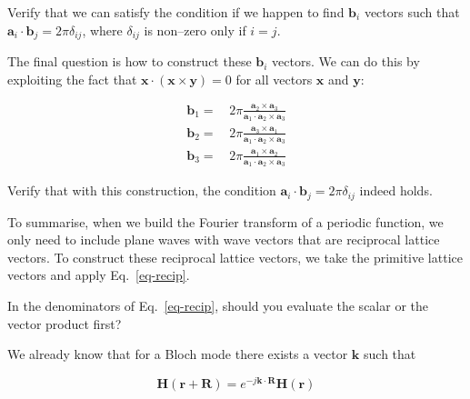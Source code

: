 \begin{cue}
Verify that we can satisfy the condition if we happen to find ${\mathbf b}_i$ vectors such that ${\mathbf a}_i \cdot {\mathbf b}_j = 2 \pi \delta_{ij}$, where $\delta_{ij}$ is non--zero only if $i=j$.
\end{cue}

The final question is how to construct these ${\mathbf b}_i$ vectors. We can do this by exploiting the fact that $ {\mathbf x} \cdot ({\mathbf x} \times {\mathbf y}) = 0$ for all vectors ${\mathbf x}$ and ${\mathbf y}$:

\begin{align}
{\mathbf b}_1 =&  \, 2 \pi \frac{{\mathbf a}_2 \times {\mathbf a}_3}{{\mathbf a}_1 \cdot {\mathbf a}_2 \times {\mathbf a}_3} \nonumber \\
  {\mathbf b}_2 =& \, 2 \pi \frac{{\mathbf a}_3 \times {\mathbf a}_1}{{\mathbf a}_1 \cdot {\mathbf a}_2 \times {\mathbf a}_3} \nonumber \\
  {\mathbf b}_3 =& \, 2 \pi \frac{{\mathbf a}_1 \times {\mathbf a}_2}{{\mathbf a}_1 \cdot {\mathbf a}_2 \times {\mathbf a}_3}
\label{eq-recip}
\end{align} 

\begin{cue}
Verify that with this construction, the condition  ${\mathbf a}_i \cdot {\mathbf b}_j = 2 \pi \delta_{ij}$ indeed holds. 
\end{cue}

To summarise, when we build the Fourier transform of a periodic function, we only need to include plane waves with wave vectors that are reciprocal lattice vectors. To construct these reciprocal lattice vectors, we take the primitive lattice vectors and apply Eq.~\ref{eq-recip}.

\begin{exer}
In the denominators of Eq.~\ref{eq-recip}, should you evaluate the scalar or the vector product first?
\end{exer}


\pagebreak


We already know that for a Bloch mode there exists a vector ${\mathbf k}$ such that

\begin{equation}
{\mathbf H} ({\mathbf r}+ {\mathbf R}) = e^{-j {\mathbf k} \cdot {\mathbf R}} {\mathbf H} ({\mathbf r})
\end{equation} 


